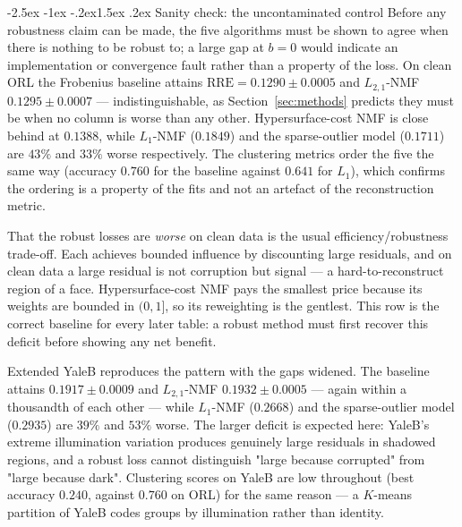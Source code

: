 \documentclass[12pt,a4paper]{article}
\makeatletter
\renewcommand\subsection{\@startsection{subsection}{2}{\z@}%
    {-2.5ex \@plus -1ex \@minus -.2ex}{1.5ex \@plus.2ex}%
    {\normalfont\fontsize{12}{14}\bfseries}}
\makeatother
\begin{document}
\subsection{Sanity check: the uncontaminated control}
Before any robustness claim can be made, the five algorithms must be shown to
agree when there is nothing to be robust to; a large gap at $b=0$ would
indicate an implementation or convergence fault rather than a property of the
loss. On clean ORL the Frobenius baseline attains
$\mathrm{RRE} = 0.1290 \pm 0.0005$ and $L_{2,1}$-NMF $0.1295 \pm 0.0007$ ---
indistinguishable, as Section~\ref{sec:methods} predicts they must be when no
column is worse than any other. Hypersurface-cost NMF is close behind at
$0.1388$, while $L_1$-NMF ($0.1849$) and the sparse-outlier model ($0.1711$)
are $43\%$ and $33\%$ worse respectively. The clustering metrics order the
five the same way (accuracy $0.760$ for the baseline against $0.641$ for
$L_1$), which confirms the ordering is a property of the fits and not an
artefact of the reconstruction metric.

That the robust losses are \emph{worse} on clean data is the usual
efficiency/robustness trade-off. Each achieves bounded influence by discounting
large residuals, and on clean data a large residual is not corruption but
signal --- a hard-to-reconstruct region of a face. Hypersurface-cost NMF pays
the smallest price because its weights are bounded in $(0,1]$, so its
reweighting is the gentlest. This row is the correct baseline for every later
table: a robust method must first recover this deficit before showing any net
benefit.

Extended YaleB reproduces the pattern with the gaps widened. The baseline
attains $0.1917 \pm 0.0009$ and $L_{2,1}$-NMF $0.1932 \pm 0.0005$ --- again
within a thousandth of each other --- while $L_1$-NMF ($0.2668$) and the
sparse-outlier model ($0.2935$) are $39\%$ and $53\%$ worse. The larger deficit
is expected here: YaleB's extreme illumination variation produces genuinely
large residuals in shadowed regions, and a robust loss cannot distinguish
"large because corrupted" from "large because dark". Clustering scores on YaleB
are low throughout (best accuracy $0.240$, against $0.760$ on ORL) for the same
reason --- a $K$-means partition of YaleB codes groups by illumination rather
than identity.
\end{document}
